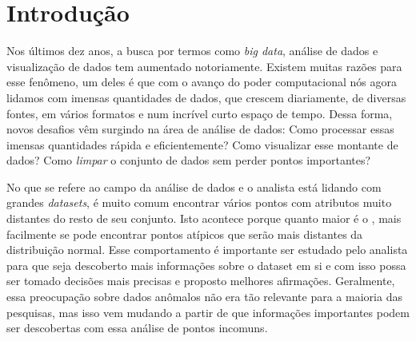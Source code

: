 \chapter{Introdução}





Nos últimos dez anos, a busca por termos como \textit{big data}, análise de dados e visualização de dados tem aumentado notoriamente. Existem muitas razões para esse fenômeno, um deles é que com o avanço do poder computacional nós agora lidamos com imensas quantidades de dados, que crescem diariamente, de diversas fontes, em vários formatos e num incrível curto espaço de tempo. Dessa forma, novos desafios vêm surgindo na área de análise de dados: Como processar essas imensas quantidades rápida e eficientemente? Como visualizar esse montante de dados? Como \textit{limpar} o conjunto de dados sem perder pontos importantes?


No que se refere ao campo da análise de dados e o analista está lidando com grandes \textit{datasets}, é muito comum encontrar vários pontos com atributos muito distantes do resto de seu conjunto. Isto acontece porque quanto maior é o , mais facilmente se pode encontrar pontos atípicos que serão mais distantes da distribuição normal. Esse comportamento é importante ser estudado pelo analista para que seja descoberto mais informações sobre o dataset em si e com isso possa ser tomado decisões mais precisas e proposto melhores afirmações. Geralmente, essa preocupação sobre dados anômalos não era tão relevante para a maioria das pesquisas, mas isso vem mudando a partir de que informações importantes podem ser descobertas com essa análise de pontos incomuns.

